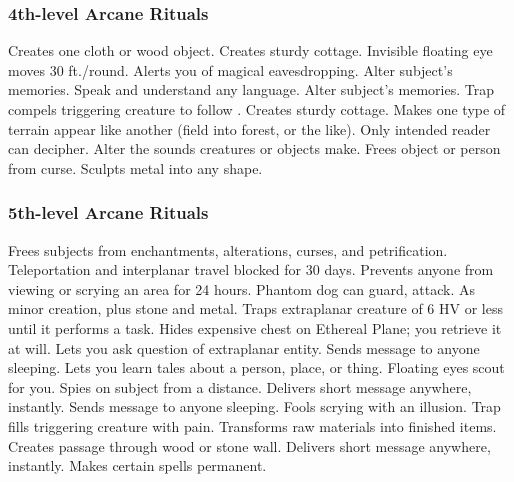 \subsubsection{4th-level Arcane Rituals}
\begin{rituallist}
     Creates one cloth or wood object.
     Creates sturdy cottage.
     Invisible floating eye moves 30 ft./round.
     Alerts you of magical eavesdropping.
     Alter subject's memories.
     Speak and understand any language.
     Alter subject's memories.
     Trap compels triggering creature to follow .
     Creates sturdy cottage.
     Makes one type of terrain appear like another (field into forest, or the like).
     Only intended reader can decipher.
     Alter the sounds creatures or objects make.
     Frees object or person from curse.
     Sculpts metal into any shape.
\end{rituallist}

\subsubsection{5th-level Arcane Rituals}
\begin{rituallist}
     Frees subjects from enchantments, alterations, curses, and petrification.
     Teleportation and interplanar travel blocked for 30 days.
     Prevents anyone from viewing or scrying an area for 24 hours.
     Phantom dog can guard, attack.
     As minor creation, plus stone and metal.
     Traps extraplanar creature of 6 HV or less until it performs a task.
    \F Hides expensive chest on Ethereal Plane; you retrieve it at will.
     Lets you ask question of extraplanar entity.
     Sends message to anyone sleeping.
    \F Lets you learn tales about a person, place, or thing.
     Floating eyes scout for you.
    \F Spies on subject from a distance.
     Delivers short message anywhere, instantly.
     Sends message to anyone sleeping.
     Fools scrying with an illusion.
     Trap fills triggering creature with pain.
     Transforms raw materials into finished items.
     Creates passage through wood or stone wall.
     Delivers short message anywhere, instantly.
     Makes certain spells permanent.
\end{rituallist}

